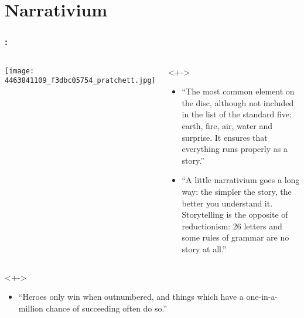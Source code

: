 

\section{Narrativium}

\begin{frame}
  \small
  \frametitle{
    :
  }

  \begin{columns}
    \texttt{[image: 4463841109\_f3dbc05754\_pratchett.jpg]}
    \begin{block}<+->{}
      \begin{itemize}
      \item<+-> 
        ``The most common element on the disc, although not
        included in the list of the standard five: earth, fire, air,
        water and surprise. It ensures that everything runs properly
        as a story.''
      \item<+->
        ``A little narrativium goes a long way: the simpler the story,
        the better you understand it. Storytelling is the opposite of
        reductionism: 26 letters and some rules of grammar are no story
        at all.''
      \end{itemize}
    \end{block}
  \end{columns}

  \begin{block}<+->{}
    \begin{itemize}
    \item
      ``Heroes only win when outnumbered, and things which have a
      one-in-a-million chance of succeeding often do so.''
    \end{itemize}
  \end{block}

\end{frame}

